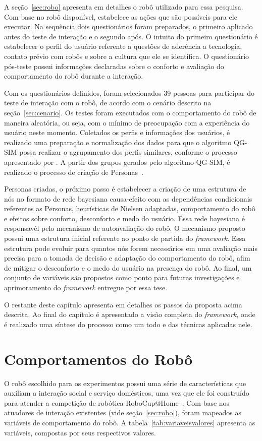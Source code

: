 A seção~\ref{sec:robo} apresenta em detalhes o robô utilizado para essa pesquisa. Com base no robô disponível, estabelece as ações que são possíveis para ele executar. Na sequência dois questionários foram preparados, o primeiro aplicado antes do teste de interação e o segundo após. O intuito do primeiro questionário é estabelecer o perfil do usuário referente a questões de aderência a tecnologia, contato prévio com robôs e sobre a cultura que ele se identifica. O questionário pós-teste possui informações declaradas sobre o conforto e avaliação do comportamento do robô durante a interação.

Com os questionários definidos, foram selecionados 39 pessoas para participar do teste de interação com o robô, de acordo com o cenário descrito na seção~\ref{sec:cenario}. Os testes foram executados com o comportamento do robô de maneira aleatória, ou seja, com o mínimo de preocupação com a experiência do usuário neste momento. Coletados os perfis e informações dos usuários, é realizado uma preparação e normalização dos dados para que o algoritmo QG-SIM possa realizar o agrupamento dos perfis similares, conforme o processo apresentado por . A partir dos grupos gerados pelo algoritmo QG-SIM, é realizado o processo de criação de Personas~\cite{masiero:2013, masiero:2013b}.

Personas criadas, o próximo passo é estabelecer a criação de uma estrutura de nós no formato de rede bayesiana causa-efeito com as dependências condicionais referentes as Personas, heurísticas de Nielsen adaptadas, comportamento do robô e efeitos sobre conforto, desconforto e medo do usuário. Essa rede bayesiana é responsavél pelo mecanismo de autoavaliação do robô. O mecanismo proposto possui uma estrutura inicial referente ao ponto de partida do \emph{framework}. Essa estrutura pode evoluir para quantos nós forem necessários em uma avaliação mais precisa para a tomada de decisão e adaptação do comportamento do robô, afim de mitigar o desconforto e o medo do usuário na presença do robô. Ao final, um conjunto de variáveis são propostos como ponto para futuras investigações e aprimoramento do \emph{framework} entregue por essa tese.

O restante deste capítulo apresenta em detalhes os passos da proposta acima descrita. Ao final do capítulo é apresentado a visão completa do \emph{framework}, onde é realizado uma síntese do processo como um todo e das técnicas aplicadas nele.

\section{Comportamentos do Robô}
\label{sec:comportamento-robo}
O robô escolhido para os experimentos possui uma série de características que auxiliam a interação social e serviço domésticos, uma vez que ele foi construído para atender a competição de robótica RoboCup@Home~\cite{robocup:2015}. Com base nos atuadores de interação existentes (vide seção~\ref{sec:robo}), foram mapeados as variáveis de comportamento do robô. A tabela~\ref{tab:variaveisvalores} apresenta as variáveis, compostas por seus respectivos valores.

